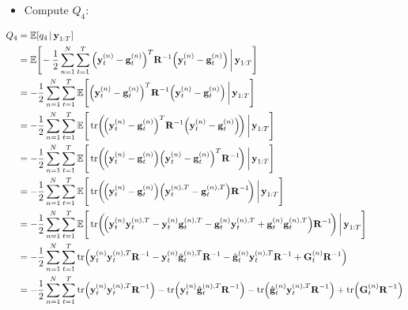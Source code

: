 		\begin{itemize}
			\item Compute \(Q_4\):
		\end{itemize}
		\begin{align*}  \allowdisplaybreaks
			Q_4
				&= \E[q_4 \given \vec{y}_{1:T}] \\
				&= \E\Bigg[\! -\frac{1}{2} \sum_{n = 1}^{N} \sum_{t = 1}^{T} \Big( \vec{y}_t^{(n)} - \vec{g}_t^{(n)} \Big)^T \mat{R}^{-1} \Big( \vec{y}_t^{(n)} - \vec{g}_t^{(n)} \Big) \bigggiven \vec{y}_{1:T} \Bigg] \\
				&= -\frac{1}{2} \sum_{n = 1}^{N} \sum_{t = 1}^{T} \E\Bigg[ \Big( \vec{y}_t^{(n)} - \vec{g}_t^{(n)} \Big)^T \mat{R}^{-1} \Big( \vec{y}_t^{(n)} - \vec{g}_t^{(n)} \Big) \bigggiven \vec{y}_{1:T} \Bigg] \\
				&= -\frac{1}{2} \sum_{n = 1}^{N} \sum_{t = 1}^{T} \E\Bigg[ \tr\!\bigg(\!\Big( \vec{y}_t^{(n)} - \vec{g}_t^{(n)} \Big)^T \mat{R}^{-1} \Big( \vec{y}_t^{(n)} - \vec{g}_t^{(n)} \Big)\!\bigg) \bigggiven \vec{y}_{1:T} \Bigg] \\
				&= -\frac{1}{2} \sum_{n = 1}^{N} \sum_{t = 1}^{T} \E\Bigg[ \tr\!\bigg(\!\Big( \vec{y}_t^{(n)} - \vec{g}_t^{(n)} \Big) \Big( \vec{y}_t^{(n)} - \vec{g}_t^{(n)} \Big)^T \mat{R}^{-1} \!\bigg) \bigggiven \vec{y}_{1:T} \Bigg] \\
				&= -\frac{1}{2} \sum_{n = 1}^{N} \sum_{t = 1}^{T} \E\Bigg[ \tr\!\bigg(\!\Big( \vec{y}_t^{(n)} - \vec{g}_t^{(n)} \Big) \Big( \vec{y}_t^{(n), T} - \vec{g}_t^{(n), T} \Big) \mat{R}^{-1} \!\bigg) \bigggiven \vec{y}_{1:T} \Bigg] \\
				&= -\frac{1}{2} \sum_{n = 1}^{N} \sum_{t = 1}^{T} \E\Bigg[ \tr\!\bigg(\!\Big( \vec{y}_t^{(n)} \vec{y}_t^{(n), T} - \vec{y}_t^{(n)} \vec{g}_t^{(n), T} - \vec{g}_t^{(n)} \vec{y}_t^{(n), T} + \vec{g}_t^{(n)} \vec{g}_t^{(n), T} \Big) \mat{R}^{-1} \!\bigg) \bigggiven \vec{y}_{1:T} \Bigg] \\
				&= -\frac{1}{2} \sum_{n = 1}^{N} \sum_{t = 1}^{T} \tr\!\Big( \vec{y}_t^{(n)} \vec{y}_t^{(n), T} \mat{R}^{-1} - \vec{y}_t^{(n)} \hat{\vec{g}}_t^{(n), T} \mat{R}^{-1} - \hat{\vec{g}}_t^{(n)} \vec{y}_t^{(n), T} \mat{R}^{-1} + \mat{G}_t^{(n)} \mat{R}^{-1} \Big) \\
				&= -\frac{1}{2} \sum_{n = 1}^{N} \sum_{t = 1}^{T} \tr\!\Big( \vec{y}_t^{(n)} \vec{y}_t^{(n), T} \mat{R}^{-1} \Big) - \tr\!\Big( \vec{y}_t^{(n)} \hat{\vec{g}}_t^{(n), T} \mat{R}^{-1} \Big) - \tr\!\Big( \hat{\vec{g}}_t^{(n)} \vec{y}_t^{(n), T} \mat{R}^{-1} \Big) + \tr\!\Big( \mat{G}_t^{(n)} \mat{R}^{-1} \Big)
		\end{align*}

